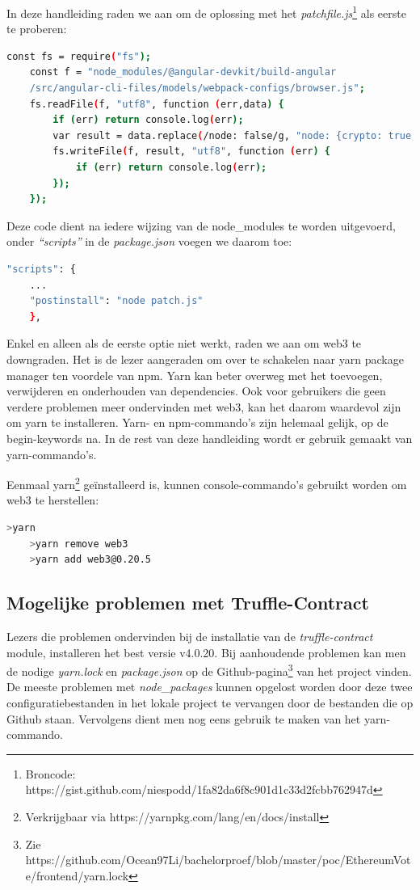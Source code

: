 	In deze handleiding raden we aan om de oplossing met het \textit{patchfile.js}\footnote{Broncode: https://gist.github.com/niespodd/1fa82da6f8c901d1c33d2fcbb762947d} als eerste te proberen:
	\begin{lstlisting}[numbers=none,language=bash]
	const fs = require("fs");
	const f = "node_modules/@angular-devkit/build-angular
	/src/angular-cli-files/models/webpack-configs/browser.js";
	fs.readFile(f, "utf8", function (err,data) {
		if (err) return console.log(err);
		var result = data.replace(/node: false/g, "node: {crypto: true, stream: true}");
		fs.writeFile(f, result, "utf8", function (err) {
			if (err) return console.log(err);
		});
	});
	\end{lstlisting}
	Deze code dient na iedere wijzing van de node\_modules te worden uitgevoerd, onder \textit{``scripts''} in de \textit{package.json} voegen we daarom toe:
	\begin{lstlisting}[numbers=none,language=bash]
	"scripts": {
	...
	"postinstall": "node patch.js"
	},
	\end{lstlisting}
	
	Enkel en alleen als de eerste optie niet werkt, raden we aan om web3 te downgraden. Het is de lezer aangeraden om over te schakelen naar yarn package manager ten voordele van npm. Yarn kan beter overweg met het toevoegen, verwijderen en onderhouden van dependencies. Ook voor gebruikers die geen verdere problemen meer ondervinden met web3, kan het daarom waardevol zijn om yarn te installeren. Yarn- en npm-commando's zijn helemaal gelijk, op de begin-keywords na. In de rest van deze handleiding wordt er gebruik gemaakt van yarn-commando's.
	
	Eenmaal yarn\footnote{Verkrijgbaar via https://yarnpkg.com/lang/en/docs/install} geïnstalleerd is, kunnen console-commando's gebruikt worden om web3 te herstellen:
	\begin{lstlisting}[numbers=none,language=bash]
	>yarn
	>yarn remove web3
	>yarn add web3@0.20.5
	\end{lstlisting}

	\subsection{Mogelijke problemen met Truffle-Contract}
	Lezers die problemen ondervinden bij de  installatie van de \textit{truffle-contract} module, installeren het best versie v4.0.20. Bij aanhoudende problemen kan men de nodige \textit{yarn.lock }en \textit{package.json} op de Github-pagina\footnote{Zie https://github.com/Ocean97Li/bachelorproef/blob/master/poc/EthereumVote/frontend/yarn.lock} van het project vinden. De meeste problemen met \textit{node\_packages} kunnen opgelost worden door deze twee configuratiebestanden in het lokale project te vervangen door de bestanden die op Github staan. Vervolgens dient men nog eens gebruik te maken van het yarn-commando.
	

